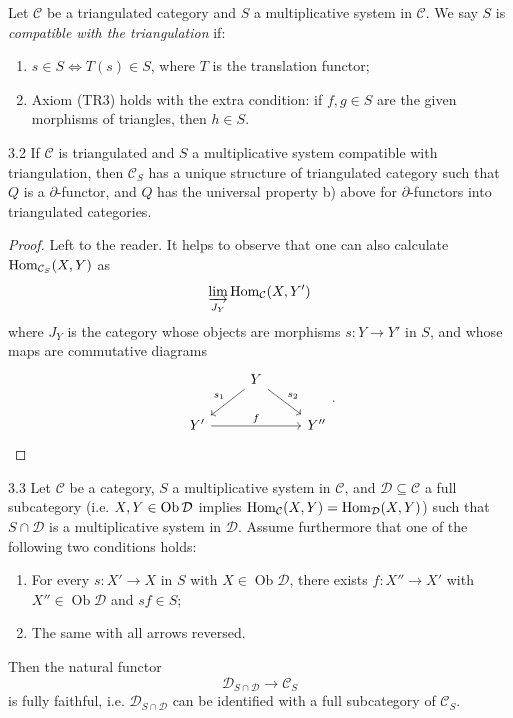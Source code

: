 \begin{definition*}
Let $\mathcal{C}$ be a triangulated category and $S$ a multiplicative system in $\mathcal{C}$. We say $S$ is \emph{compatible with the triangulation} if:
\begin{enumerate}
\item[(FR4)] $s\in S \iff T(s)\in S$, where $T$ is the translation functor;
\item[(FR5)] Axiom (TR3) holds with the extra condition: if $f,g\in S$ are the given morphisms of triangles, then  $h\in S$.
\end{enumerate}
\end{definition*}

\begin{bookproposition}{3.2}\label{prop:1.3.2}
If $\mathcal{C}$ is triangulated and $S$ a multiplicative system compatible with triangulation, then $\mathcal{C}_S$ has a unique structure of triangulated category such
that $Q$ is a $\partial$-functor, and $Q$ has the universal property b)
above for $\partial$-functors into triangulated categories.
\end{bookproposition}

\begin{proof}
	Left to the reader. It helps to observe that one can also calculate $\operatorname{Hom}_{\mathcal{C}_S}(X,Y)$ as
	\[
	\varinjlim_{J_Y} \operatorname{Hom}_{\mathcal{C}}(X,Y')
	\]
	where $J_Y$ is the category whose objects are morphisms $s: Y \longrightarrow Y'$ in $S$, and whose maps are commutative diagrams
	\[
	\begin{tikzcd}
		& Y \arrow[ld, "s_1"'] \arrow[rd, "s_2"] & \\
		Y' \arrow[rr, "f"] & & Y''
	\end{tikzcd}
	.
	\]
\end{proof}

\begin{bookproposition}{3.3}\label{prop:1.3.3}
Let $\mathcal{C}$ be a category, $S$ a multiplicative system in $\mathcal{C}$, and $\mathcal{D}\subseteq\mathcal{C}$ a full subcategory (i.e. $X,Y\in \operatorname{Ob} \mathcal{D}$ implies $\operatorname{Hom}_{\mathcal{C}}(X,Y)=\operatorname{Hom}_{\mathcal{D}}(X,Y)$) such that $S\cap\mathcal{D}$ is a multiplicative system in $\mathcal{D}$. Assume furthermore
that one of the following two conditions holds:
\begin{enumerate}
\item[(i)] For every $s\colon X'\to X$ in $S$ with $X\in\operatorname{Ob}\mathcal{D}$, there exists $f\colon X''\to X'$ with $X''\in\operatorname{Ob}\mathcal{D}$ and $sf\in S$;
\item[(ii)] The same with all arrows reversed.
\end{enumerate}
Then the natural functor
\[
\mathcal{D}_{S\cap\mathcal{D}} \to \mathcal{C}_S
\]
is fully faithful, i.e. $\mathcal{D}_{S\cap\mathcal{D}}$ can be identified with a full subcategory of $\mathcal{C}_S$.
\end{bookproposition}

